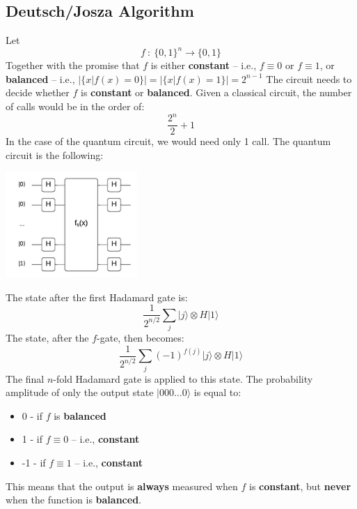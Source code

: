 \documentclass{article}
\begin{document}
\subsection{Deutsch/Josza Algorithm}
Let
\[ f~:~\{ 0, 1 \}^n \rightarrow \{ 0, 1 \} \]
Together with the promise that $f$ is either \textbf{constant} -- i.e., $f \equiv 0$ or $f \equiv 1$, or \textbf{balanced} -- i.e., $|\{ x|f(x) = 0 \}| = |\{ x|f(x) = 1 \}| = 2^{n-1}$ The circuit needs to decide whether $f$ is \textbf{constant} or \textbf{balanced}. Given a classical circuit, the number of calls would be in the order of:
\[ \displaystyle\frac{2^n}{2} + 1 \]
In the case of the quantum circuit, we would need only 1 call. The quantum circuit is the following:
\begin{center}
	\includegraphics[width=5cm]{assets/circuit6.png}
\end{center}
The state after the first Hadamard gate is:
\[ \displaystyle\frac{1}{2^{n/2}} \sum_j |j\rangle \otimes H|1\rangle \]
The state, after the $f$-gate, then becomes:
\[ \displaystyle\frac{1}{2^{n/2}} \sum_j (-1)^{f(j)} |j\rangle \otimes H|1\rangle \]
The final $n$-fold Hadamard gate is applied to this state. The probability amplitude of only the output state $|000\dots 0\rangle$ is equal to:
\begin{itemize}
	\item 0 - if $f$ is \textbf{balanced}
	\item 1 - if $f \equiv 0$ -- i.e., \textbf{constant}
	\item -1 - if $f \equiv 1$ -- i.e., \textbf{constant}
\end{itemize}
This means that the output is \textbf{always} measured when $f$ is \textbf{constant}, but \textbf{never} when the function is \textbf{balanced}.
\end{document}
